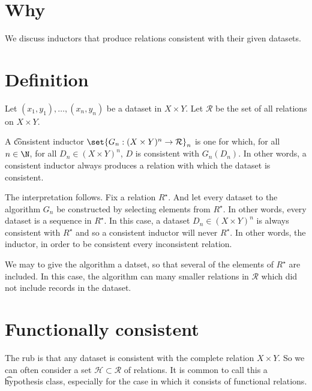 

\section*{Why}

We discuss inductors that produce relations consistent with their given datasets.

\section*{Definition}

Let $(x_1, y_1), \dots , (x_n, y_n)$ be a dataset in $X \times  Y$.
Let $\mathcal{R} $ be the set of all relations on $X \times Y$.

A \t{consistent inductor} $\set{G_n: (X \times  Y)^n \to \mathcal{R} }_{n}$ is one for which, for all $n \in \N  $, for all $D_n \in (X \times  Y)^n$, $D$ is consistent with $G_n(D_n)$.
In other words, a consistent inductor always produces a relation with which the dataset is consistent.

The interpretation follows.
Fix a relation $R^\star$.
And let every dataset  to the algorithm $G_n$ be constructed by selecting elements from $R^{\star}$.
In other words, every dataset is a sequence in $R^\star$.
In this case, a dataset $D_n \in (X \times Y)^n$ is always consistent with $R^\star$ and so a consistent inductor will never  $R^{\star}$.
In other words, the inductor, in order to be consistent  every inconsistent relation.

We may  to give the algorithm a  datset, so that several of the elements of $R^\star$ are included.
In this case, the algorithm can  many smaller relations in $\mathcal{R} $ which did not include records in the dataset.

\section*{Functionally consistent}

The rub is that any dataset is consistent with the complete relation $X \times  Y$.
So we can often consider a set $\mathcal{H}  \subset \mathcal{R} $ of relations.
It is common to call this a \t{hypothesis class}, especially for the case in which it consists of functional relations.
